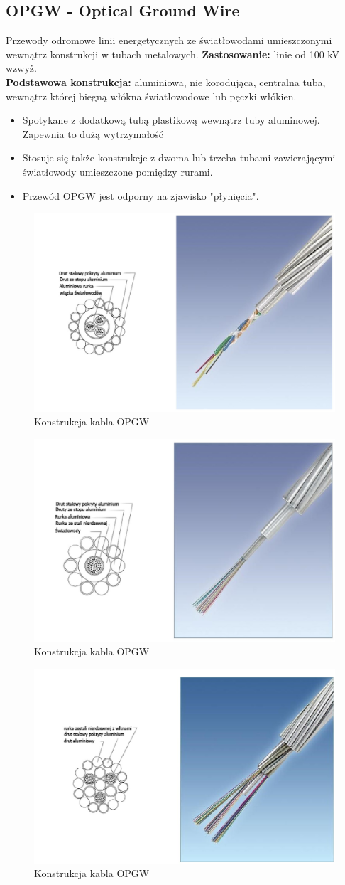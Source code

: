 \documentclass{article}
\begin{document}
\subsection{OPGW - Optical Ground Wire}
Przewody odromowe linii energetycznych ze światłowodami umieszczonymi wewnątrz konstrukcji w tubach metalowych.
\textbf{Zastosowanie:} linie od 100 kV wzwyż.\\
\textbf{Podstawowa konstrukcja:} aluminiowa, nie korodująca, centralna tuba, wewnątrz której biegną włókna światłowodowe lub pęczki włókien.
\begin{itemize}
    \item Spotykane z dodatkową tubą plastikową wewnątrz tuby aluminowej. Zapewnia to dużą wytrzymałość
    \item Stosuje się także konstrukcje z dwoma lub trzeba tubami zawierającymi światłowody umieszczone pomiędzy rurami.
    \item Przewód OPGW jest odporny na zjawisko "płynięcia".
\end{itemize}
\begin{figure}[H]
    \centering
    \includegraphics[width=0.6\linewidth]{w05z04.jpg}
    \caption{Konstrukcja kabla OPGW}
\end{figure}
\begin{figure}[H]
    \centering
    \includegraphics[width=0.6\linewidth]{w05z05.jpg}
    \caption{Konstrukcja kabla OPGW}
\end{figure}
\begin{figure}[H]
    \centering
    \includegraphics[width=0.6\linewidth]{w05z06.jpg}
    \caption{Konstrukcja kabla OPGW}
\end{figure}
\end{document}
